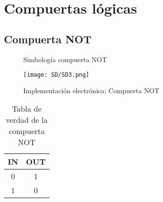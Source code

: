 \documentclass[
	12pt, %
	fleqn, %
	a4paper, %
]{LegrandOrangeBook}
\begin{document}
\section{Compuertas lógicas}
\subsection{Compuerta NOT}
\begin{figure}[H]
\centering
{}
\caption{Simbología compuerta NOT}
\end{figure}
\begin{figure}[h!]
\centering
\texttt{[image: SD/SD3.png]}
\caption{Implementación electrónica: Compuerta NOT}
\end{figure}
\begin{table}[H]
\begin{center}
\begin{tabular}{|c|c|}
\hline
\rowcolor{color1}
IN & OUT \\ \hline
0  & 1   \\ \hline
1  & 0   \\ \hline
\end{tabular}
\end{center}
\caption{Tabla de verdad de la compuerta NOT}
\label{table:nottable}
\end{table}
\end{document}
